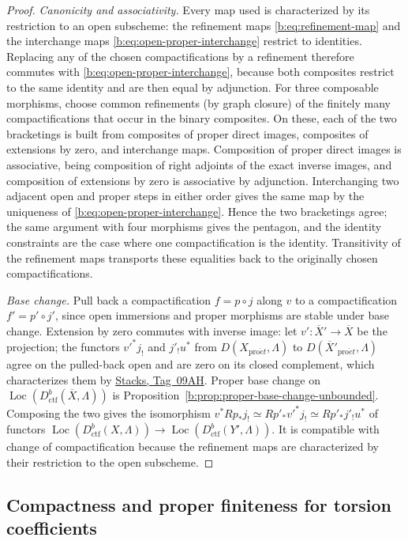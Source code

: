 \documentclass[11pt,a4paper]{article}
\numberwithin{equation}{section}
\theoremstyle{definition}
\theoremstyle{remark}
\newcommand{\Loc}{\operatorname{Loc}}
\newcommand{\proet}{\mathrm{pro}\acute{e}t}
\newcommand{\stacks}[1]{\href{https://stacks.math.columbia.edu/tag/#1}{\textnormal{Stacks, Tag~#1}}}
\newcommand{\Dctf}{D^b_{\mathrm{ctf}}}
\begin{document}
\begin{proof}
\emph{Canonicity and associativity.} Every map used is characterized by
its restriction to an open subscheme: the refinement maps
\eqref{b:eq:refinement-map} and the interchange maps
\eqref{b:eq:open-proper-interchange} restrict to identities. Replacing any
of the chosen compactifications by a refinement therefore commutes with
\eqref{b:eq:open-proper-interchange}, because both composites restrict to
the same identity and are then equal by adjunction. For three composable
morphisms, choose common refinements (by graph closure) of the finitely
many compactifications that occur in the binary composites. On these, each
of the two bracketings is built from composites of proper direct images,
composites of extensions by zero, and interchange maps. Composition of
proper direct images is associative, being composition of right adjoints
of the exact inverse images, and composition of extensions by zero is
associative by adjunction. Interchanging two adjacent open and proper
steps in either order gives the same map by the uniqueness of
\eqref{b:eq:open-proper-interchange}. Hence the two bracketings agree; the
same argument with four morphisms gives the pentagon, and the identity
constraints are the case where one compactification is the identity.
Transitivity of the refinement maps transports these equalities back to
the originally chosen compactifications.

\emph{Base change.} Pull back a compactification $f=p\circ j$ along $v$ to
a compactification $f'=p'\circ j'$, since open immersions and proper
morphisms are stable under base change. Extension by zero commutes with inverse
image: let $v':\overline X'\to\overline X$ be the projection; the functors
$v'^*j_!$ and $j'_!u^*$ from $D(X_{\proet},\Lambda)$ to
$D(\overline X'_{\proet},\Lambda)$ agree on the pulled-back open and are zero
on its closed complement, which characterizes them by \stacks{09AH}. Proper base change
on $\Loc(\Dctf(\overline X,\Lambda))$ is
Proposition~\ref{b:prop:proper-base-change-unbounded}. Composing the two
gives the isomorphism $v^*Rp_*j_!\simeq Rp'_*v'^*j_!\simeq Rp'_*j'_!u^*$ of
functors $\Loc(\Dctf(X,\Lambda))\to\Loc(\Dctf(Y',\Lambda))$. It is
compatible with change of compactification because the refinement maps are
characterized by their restriction to the open subscheme.
\end{proof}

\subsection{Compactness and proper finiteness for torsion coefficients}
\label{ctf:finite-foundations}
\end{document}
